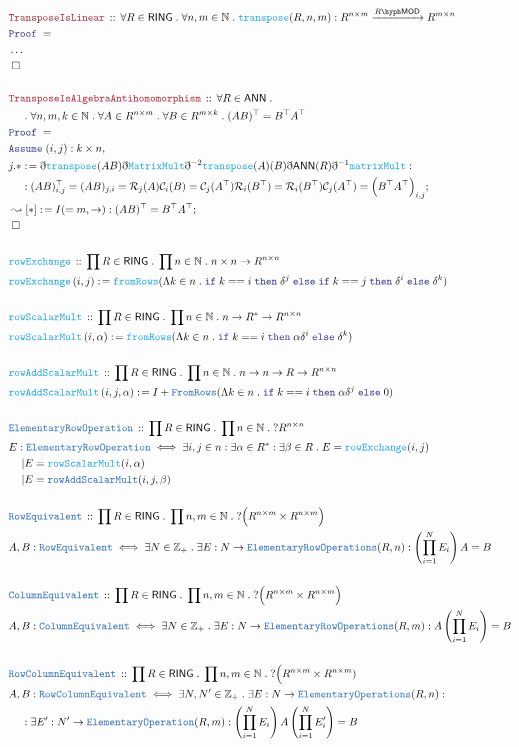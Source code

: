 \documentclass[12pt]{scrartcl}
\newcommand{\TYPE}[1]{\textcolor{NavyBlue}{\mathtt{#1}}}
\newcommand{\FUNC}[1]{\textcolor{Cerulean}{\mathtt{#1}}}
\newcommand{\LOGIC}[1]{\textcolor{Blue}{\mathtt{#1}}}
\newcommand{\THM}[1]{\textcolor{Maroon}{\mathtt{#1}}}
\renewcommand{\.}{\; . \;}
\newcommand{\de}{: \kern 0.1pc =}
\newcommand{\If}{\LOGIC{if} \;}
\newcommand{\Then}{ \; \LOGIC{then} \;}
\newcommand{\Else}{\; \LOGIC{else} \;}
\newcommand{\Act}[1]{\left(#1\right)}
\newcommand{\Theorem}[2]{& \THM{#1} \, :: \, #2 \\ & \Proof = \\ }
\newcommand{\DeclareType}[2]{& \TYPE{#1} \, :: \, #2 \\}
\newcommand{\DefineType}[3]{& #1 : \TYPE{#2} \iff #3 \\}
\newcommand{\DeclareFunc}[2]{& \FUNC{#1} \, :: \, #2 \\}
\newcommand{\DefineFunc}[3]{&  \FUNC{#1}\Act{#2} \de #3 \\}
\newcommand{\NewLine}{\\ & \kern 1pc}
\newcommand{\Page}[1]{ \begin{align*} #1 \end{align*}   }
\newcommand{ \bd }{ \ByDef }
\newcommand{\NoProof}{ & \ldots \\ \EndProof}
\newcommand{\Int}{\mathbb{Z} }
\newcommand{\Nat}{\mathbb{N} }
\newcommand{\Conclude}[3]{& #1 \de #2 : #3; \\}
\newcommand{\DeriveConclude}[3]{& \leadsto #1 \de #2 : #3 ; \\}
\newcommand{\Assume}[2]{& \LOGIC{Assume} \; #1 : #2, \\}
\newcommand{\QED}{\; \square}
\newcommand{\EndProof}{& \QED \\}
\newcommand{\ByDef}{\eth}
\newcommand{\Proof}{\LOGIC{Proof} \; }
\newcommand{\Arrow}[1]{\xrightarrow{#1}}
\newcommand{\C}{\mathcal{C}}
\newcommand{\R}{\mathcal{R}}
\newcommand{\LMOD}[1]{#1\hyph\mathsf{MOD}}
\newcommand{\RING}{\mathsf{RING}}
\newcommand{\ANN}{\mathsf{ANN}}
\begin{document}
\Page{
	\Theorem{TransposeIsLinear}
	{
		\forall R \in \RING \.
		\forall n,m \in \Nat \.
		\FUNC{transpose}(R,n,m) : R^{n\times m} \Arrow{\LMOD{R}} R^{m \times n}
	}
	\NoProof
	\\
	\Theorem{TransposeIsAlgebraAntihomomorphism}{
		\forall R \in \ANN \. \NewLine \. 
		\forall n,m,k \in \Nat \. \forall A \in R^{n \times m} \. \forall B \in R^{m \times k} \. 
		(AB)^\top = B^\top A^\top 
	}
	\Assume{(i,j)}{k \times n}
	\Conclude{j.*}{\bd \FUNC{transpose}(AB) \bd \FUNC{MatrixMult}
		\bd^{-2}\FUNC{transpose}(A)(B)\bd\ANN(R)\bd^{-1}\FUNC{matrixMult}}{  
			\NewLine :
			(AB)^\top_{i,j} = 
			(AB)_{j,i} = 
			\R_j(A)\C_i(B) = 
			\C_j(A^\top)\R_i(B^\top) = 
			\R_i(B^\top)\C_j(A^\top) =
			\Big(B^\top A^\top\Big)_{i,j}
	}
	\DeriveConclude{[*]}{ I(=m,\to) }{ (AB)^\top = B^\top A^\top }
	\EndProof
	\\
	\DeclareFunc{rowExchange}{\prod R \in \RING \. \prod n \in \Nat \. n \times n \to R^{n\times n}}
	\DefineFunc{rowExchange}{i,j}{\FUNC{fromRows}(\Lambda k \in n \. 
		\If k == i \Then \delta^j \Else \If k == j  \Then \delta^i \Else \delta^k )}
	\\
	\DeclareFunc{rowScalarMult}{\prod R \in \RING \. \prod n \in \Nat \. n \to R^* \to R^{n\times n}}
	\DefineFunc{rowScalarMult}{i,\alpha}{\FUNC{fromRows}(\Lambda k \in n \. \If k == i \Then \alpha \delta^i \Else \delta^k)}
	\\
	\DeclareFunc{rowAddScalarMult}{\prod R \in \RING \. \prod n \in \Nat \. n \to n \to R \to R^{n\times n}}
	\DefineFunc{rowAddScalarMult}{i,j,\alpha}{I + \TYPE{FromRows}(\Lambda k \in n \.\If k == i \Then \alpha \delta^j \Else 0)}
	\\
	\DeclareType{ElementaryRowOperation}{\prod R \in \RING \. \prod n  \in \Nat \. ?R^{n\times n}}
	\DefineType{E}{ElementaryRowOperation}{ \exists i,j \in n : \exists \alpha \in R^* : \exists \beta \in R \. 
		E = \FUNC{rowExchange}(i,j)  \NewLine | E = \FUNC{rowScalarMult}(i,\alpha)  \NewLine |  E = \TYPE{rowAddScalarMult}(i,j,\beta) }
	\\
	\DeclareType{RowEquivalent}{\prod R \in \RING \. \prod n,m \in \Nat \. ?\Big(R^{n\times m} \times R^{n \times m}\Big)}
	\DefineType{A,B}{RowEquivalent}
	{
		\exists N \in \Int_+ \. 
		\exists E : N \to \TYPE{ElementaryRowOperations}(R,n) :
		\left(\prod^N_{i=1} E_i\right)A = B
	}
	\\
	\DeclareType{ColumnEquivalent}{\prod R \in \RING \. \prod n,m \in \Nat \. ?\Big(R^{n\times m} \times R^{n \times m}\Big)}
	\DefineType{A,B}{ColumnEquivalent}
	{
		\exists N \in \Int_+ \. 
		\exists E : N \to \TYPE{ElementaryRowOperations}(R,m) :
		A\left(\prod^N_{i=1} E_i\right) = B
	}
	\\
	\DeclareType{RowColumnEquivalent}{\prod R \in \RING \. \prod n,m \in \Nat \. ?\Big(R^{n \times m} \times R^{n \times m})}
	\DefineType{A,B}{RowColumnEquivalent}{
			\exists N,N' \in \Int_+ \. 
			\exists E : N \to \TYPE{ElementaryOperations}(R,n) : \NewLine :
			\exists E': N' \to \TYPE{ElementaryOperation}(R,m) :
			\left(\prod^N_{i=1} E_i \right)A\left( \prod^N_{i=1} E_i' \right) = B
		}
}
\end{document}
